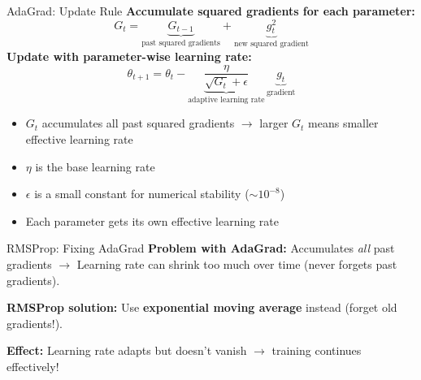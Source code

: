 \begin{frame}{AdaGrad: Update Rule}
\textbf{Accumulate squared gradients for each parameter:}
\[
G_t = \underbrace{G_{t-1}}_{\text{past squared gradients}} + \underbrace{g_t^2}_{\text{new squared gradient}}
\]
\textbf{Update with parameter-wise learning rate:}
\[
\theta_{t+1} = \theta_t - \underbrace{\frac{\eta}{\sqrt{G_t} + \epsilon}}_{\text{adaptive learning rate}} \, \underbrace{g_t}_{\text{gradient}}
\]
\begin{itemize}
\item $G_t$ accumulates all past squared gradients $\rightarrow$ larger $G_t$ means smaller effective learning rate
\item $\eta$ is the base learning rate
\item $\epsilon$ is a small constant for numerical stability ($\sim 10^{-8}$)
\item Each parameter gets its own effective learning rate
\end{itemize}
\end{frame}

\begin{frame}{RMSProp: Fixing AdaGrad}
\textbf{Problem with AdaGrad:} Accumulates \textit{all} past gradients $\rightarrow$ Learning rate can shrink too much over time (never forgets past gradients).

\textbf{RMSProp solution:} Use \textbf{exponential moving average} instead (forget old gradients!).

\vspace{0.5em}
\centering
{}

\vspace{0.7em}
\textbf{Effect:} Learning rate adapts but doesn't vanish $\rightarrow$ training continues effectively!
\end{frame}

